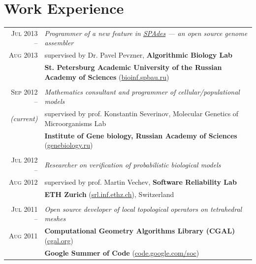 \documentclass[a4paper,10pt]{article}
\def\myline{\color{linegray}\vline}
\begin{document}
{\section{Work Experience}
\hspace{0mm}\begin{tabular}{r!{\myline}p{14cm}}
  \textsc{Jul 2013 --}      &  \textit{Programmer of a new feature in \href{http://bioinf.spbau.ru/spades}{SPAdes} --- an open source genome assembler}\\
  \textsc{Aug 2013} &  supervised by Dr. Pavel Pevzner, \textbf{Algorithmic Biology Lab}\\
                                  &  \textbf{St. Petersburg Academic University of the Russian Academy of Sciences} (\href{http://bioinf.spbau.ru/}{bioinf.spbau.ru})\\

        \\
	\textsc{Sep 2012 --}      &  \textit{Mathematics consultant and programmer of cellular/populational models}\\
        \small\textit{(current)}  &  supervised by prof. Konstantin Severinov, Molecular Genetics of Microorganisms Lab\\
                                  &  \textbf{Institute of Gene biology, Russian Academy of Sciences} (\href{http://www.genebiology.ru/}{genebiology.ru})\\
	
        \\
	\textsc{Jul 2012 --}      &  \textit{Researcher on verification of probabilistic biological models}\\
        \textsc{Aug 2012} &  supervised by prof. Martin Vechev, \textbf{Software Reliability Lab}\\
                                  &  \textbf{ETH Zurich} (\href{http://www.srl.inf.ethz.ch/}{srl.inf.ethz.ch}), Switzerland\\
	
        \\
	\textsc{Jul 2011 --}      &  \textit{Open source developer of local topological operators on tetrahedral meshes}\\
	\textsc{Aug 2011}         &  \textbf{Computational Geometry Algorithms Library (CGAL)} (\href{http://www.cgal.org/}{cgal.org})\\
                                  &  \textbf{Google Summer of Code} (\href{http://code.google.com/soc/}{code.google.com/soc})\\
	

\end{tabular}}
\end{document}
